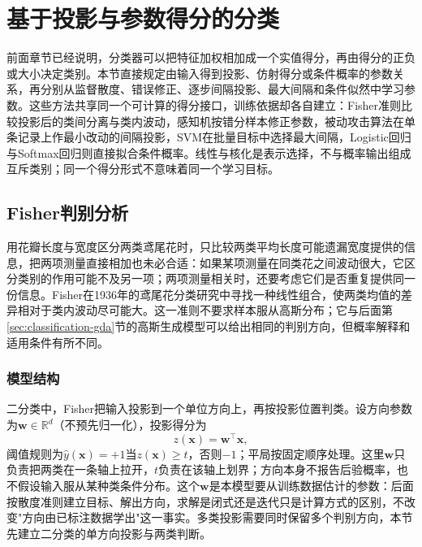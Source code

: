 \section{基于投影与参数得分的分类}
\label{sec:classification-linear-score}

前面章节已经说明，分类器可以把特征加权相加成一个实值得分，再由得分的正负或大小决定类别。本节直接规定由输入得到投影、仿射得分或条件概率的参数关系，再分别从监督散度、错误修正、逐步间隔投影、最大间隔和条件似然中学习参数。这些方法共享同一个可计算的得分接口，训练依据却各自建立：Fisher准则比较投影后的类间分离与类内波动，感知机按错分样本修正参数，被动攻击算法在单条记录上作最小改动的间隔投影，SVM在批量目标中选择最大间隔，Logistic回归与Softmax回归则直接拟合条件概率。线性与核化是表示选择，不与概率输出组成互斥类别；同一个得分形式不意味着同一个学习目标。

\subsection{Fisher判别分析}
\label{sec:classification-fisher}

用花瓣长度与宽度区分两类鸢尾花时，只比较两类平均长度可能遗漏宽度提供的信息，把两项测量直接相加也未必合适：如果某项测量在同类花之间波动很大，它区分类别的作用可能不及另一项；两项测量相关时，还要考虑它们是否重复提供同一份信息。Fisher在1936年的鸢尾花分类研究中寻找一种线性组合，使两类均值的差异相对于类内波动尽可能大。这一准则不要求样本服从高斯分布；它与后面第\ref{sec:classification-gda}节的高斯生成模型可以给出相同的判别方向，但概率解释和适用条件有所不同。

\subsubsection{模型结构}
\label{sec:classification-fisher-structure}

二分类中，Fisher把输入投影到一个单位方向上，再按投影位置判类。设方向参数为$\bm{w}\in\mathbb{R}^{d}$（不预先归一化），投影得分为
\begin{equation}
  z(\bm{x})=\bm{w}^{\top}\bm{x},
\end{equation}
阈值规则为$\hat y(\bm{x})=+1$当$z(\bm{x})\geq t$，否则$-1$；平局按固定顺序处理。这里$\bm{w}$只负责把两类在一条轴上拉开，$t$负责在该轴上划界；方向本身不报告后验概率，也不假设输入服从某种类条件分布。这个$\bm{w}$是本模型要从训练数据估计的参数：后面按散度准则建立目标、解出方向，求解是闭式还是迭代只是计算方式的区别，不改变"方向由已标注数据学出"这一事实。多类投影需要同时保留多个判别方向，本节先建立二分类的单方向投影与两类判断。

